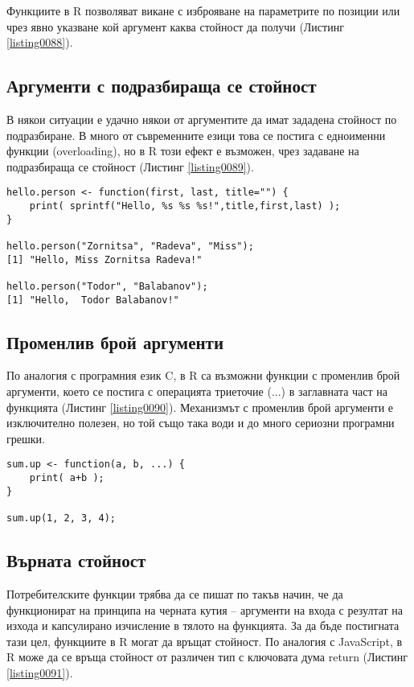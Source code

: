 Функциите в R позволяват викане с изброяване на параметрите по позиции или чрез явно указване кой аргумент каква стойност да получи (Листинг \ref{listing0088}).

\subsection{Аргументи с подразбираща се стойност}

В някои ситуации е удачно някои от аргументите да имат зададена стойност по подразбиране. В много от съвременните езици това се постига с едноименни функции (overloading), но в R този ефект е възможен, чрез задаване на подразбираща се стойност (Листинг \ref{listing0089}). 

\begin{lstlisting}[caption=Извикване на функция с подразбиращи се аргументи, label=listing0089]
hello.person <- function(first, last, title="") {
	print( sprintf("Hello, %s %s %s!",title,first,last) );
}

hello.person("Zornitsa", "Radeva", "Miss");
[1] "Hello, Miss Zornitsa Radeva!"

hello.person("Todor", "Balabanov");
[1] "Hello,  Todor Balabanov!"
\end{lstlisting}

\subsection{Променлив брой аргументи}

По аналогия с програмния език C, в R са възможни функции с променлив брой аргументи, което се постига с операцията триеточие (...) в заглавната част на функцията (Листинг \ref{listing0090}). Механизмът с променлив брой аргументи е изключително полезен, но той също така води и до много сериозни програмни грешки. 

\begin{lstlisting}[caption=Функция с променлив брой аргументи, label=listing0090]
sum.up <- function(a, b, ...) {
	print( a+b );
}

sum.up(1, 2, 3, 4);
\end{lstlisting}

\subsection{Върната стойност}

Потребителските функции трябва да се пишат по такъв начин, че да функционират на принципа на черната кутия – аргументи на входа с резултат на изхода и капсулирано изчисление в тялото на функцията. За да бъде постигната тази цел, функциите в R могат да връщат стойност. По аналогия с JavaScript, в R може да се връща стойност от различен тип с ключовата дума return (Листинг \ref{listing0091}).

